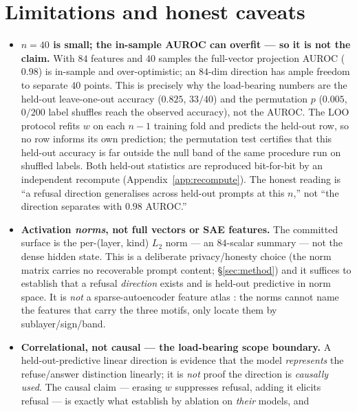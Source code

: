 \documentclass[11pt,a4paper]{article}
\begin{document}
\section{Limitations and honest caveats}
\label{sec:limits}
\begin{itemize}
  \item \textbf{\(n{=}40\) is small; the in-sample AUROC can overfit --- so it is
    not the claim.} With \(84\) features and \(40\) samples the full-vector
    projection AUROC (\(0.98\)) is in-sample and over-optimistic; an \(84\)-dim
    direction has ample freedom to separate \(40\) points. This is precisely why
    the load-bearing numbers are the held-out leave-one-out accuracy (\(0.825\),
    \(33/40\)) and the permutation \(p\) (\(0.005\), \(0/200\) label shuffles
    reach the observed accuracy), not the AUROC. The LOO protocol refits \(w\) on
    each \(n{-}1\) training fold and predicts the held-out row, so no row informs
    its own prediction; the permutation test certifies that this held-out
    accuracy is far outside the null band of the same procedure run on shuffled
    labels. Both held-out statistics are reproduced bit-for-bit by an independent
    recompute (Appendix~\ref{app:recompute}). The honest reading is ``a refusal
    direction generalises across held-out prompts at this $n$,'' not ``the
    direction separates with $0.98$ AUROC.''
  \item \textbf{Activation \emph{norms}, not full vectors or SAE features.} The
    committed surface is the per-(layer, kind) \(L_2\) norm --- an \(84\)-scalar
    summary --- not the dense hidden state. This is a deliberate privacy/honesty
    choice (the norm matrix carries no recoverable prompt content;
    \S\ref{sec:method}) and it suffices to establish that a refusal
    \emph{direction} exists and is held-out predictive in norm space. It is
    \emph{not} a sparse-autoencoder feature atlas \citep{cunningham2023sae,
    bricken2023monosemanticity}: the norms cannot name the features that carry
    the three motifs, only locate them by sublayer/sign/band.
  \item \textbf{Correlational, not causal --- the load-bearing scope boundary.}
    A held-out-predictive linear direction is evidence that the model
    \emph{represents} the refuse/answer distinction linearly; it is \emph{not}
    proof the direction is \emph{causally used}. The causal claim --- erasing
    \(w\) suppresses refusal, adding it elicits refusal --- is exactly what
    \citet{arditi2024refusal} establish by ablation on \emph{their} models, and

\end{itemize}
\end{document}

